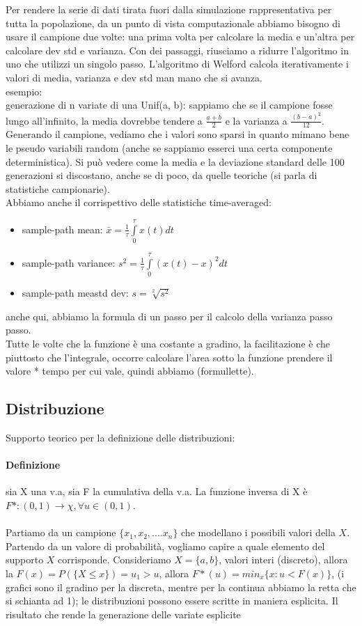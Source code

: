 \documentclass{article}
\begin{document}
Per rendere la serie di dati tirata fuori dalla simulazione rappresentativa per tutta la popolazione, da un punto di vista computazionale abbiamo bisogno di usare il campione due volte:  una prima volta per calcolare la media e un'altra per calcolare dev std e varianza. Con dei passaggi, riusciamo a ridurre l'algoritmo in uno che utilizzi un singolo passo. L'algoritmo di Welford calcola iterativamente i valori di media, varianza e dev std man mano che si avanza.\\ esempio: \\ generazione di n variate di una Unif(a, b): sappiamo che se il campione fosse lungo all'infinito, la media dovrebbe tendere a $\frac{a + b}{2}$ e la varianza a $\frac{(b - a)^2}{12}$. Generando il campione, vediamo che i valori sono sparsi in quanto mimano bene le pseudo variabili random (anche se sappiamo esserci una certa componente deterministica). Si può vedere come la media e la deviazione standard delle 100 generazioni si discostano, anche se di poco, da quelle teoriche (si parla di statistiche campionarie).\\ Abbiamo anche il corrispettivo delle statistiche time-averaged:
\begin{itemize}
\item sample-path mean: $\bar{x} = \frac{1}{\tau} \int\limits_{0}^{\tau} x(t) dt$
\item sample-path variance: $s^2 = \frac{1}{\tau} \int\limits_{0}^{\tau} (x(t)-x)^2 dt$
\item sample-path meastd dev: $s = \sqrt[2]{s^2}$
\end{itemize}
anche qui, abbiamo la formula di un passo per il calcolo della varianza passo passo.\\ Tutte le volte che la funzione è una costante a gradino, la facilitazione è che piuttosto che l'integrale, occorre calcolare l'area sotto la funzione prendere il valore * tempo per cui vale, quindi abbiamo (formullette).\\ 
\subsection{Distribuzione}
Supporto teorico per la definizione delle distribuzioni:
\paragraph{Definizione}sia X una v.a, sia F la cumulativa della v.a. La funzione inversa di X è $F*: (0, 1)\rightarrow \chi, \forall u \in (0,1)$.\\\\ Partiamo da un campione $\{ x_1, x_2, .... x_n\}$ che modellano i possibili valori della $X$. Partendo da un valore di probabilità, vogliamo capire a quale elemento del supporto $X$ corrisponde. Consideriamo $X = \{a, b\}$, valori interi (discreto), allora la $F(x) = P(\{X \leq x\}) = u_1 > u$, allora $F*(u) = min_{x} \{x: u < F(x)\}$, (i grafici sono il gradino per la discreta, mentre per la continua abbiamo la retta che si schianta ad 1); le distribuzioni possono essere scritte in maniera esplicita. Il risultato che rende la generazione delle variate esplicite
\end{document}
